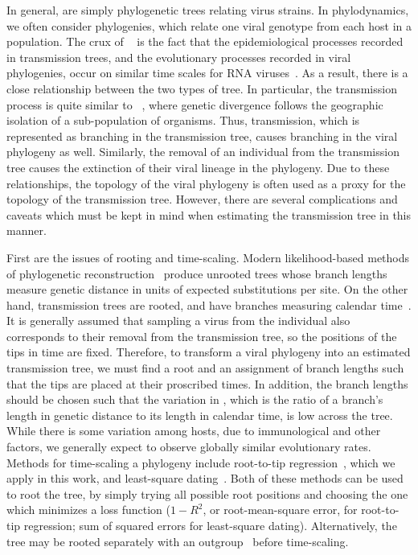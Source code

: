 In general,  are simply phylogenetic trees relating
virus strains. In phylodynamics, we often consider 
phylogenies, which relate one viral genotype from each host in a population.
The crux of ~\autocite{grenfell2004unifying} is the fact
that the epidemiological processes recorded in transmission trees, and the
evolutionary processes recorded in viral phylogenies, occur on similar time
scales for RNA viruses~\autocite{drummond2003measurably}. As a result, there is
a close relationship between the two types of tree. In particular, the
transmission process is quite similar to ~\autocite{coyne2004speciation}, where genetic divergence follows
the geographic isolation of a sub-population of organisms. Thus, transmission,
which is represented as branching in the transmission tree, causes branching in
the viral phylogeny as well. Similarly, the removal of an individual from the
transmission tree causes the extinction of their viral lineage in the
phylogeny. Due to these relationships, the topology of the viral phylogeny is
often used as a proxy for the topology of the transmission tree. However, there
are several complications and caveats which must be kept in mind when
estimating the transmission tree in this manner.

First are the issues of rooting and time-scaling. Modern likelihood-based
methods of phylogenetic reconstruction~\autocite[\eg][]{price2010fasttree,
stamatakis2014raxml} produce unrooted trees whose branch lengths measure
genetic distance in units of expected substitutions per site. On the other
hand, transmission trees are rooted, and have branches measuring calendar
time~\autocite{pybus2009evolutionary}. It is generally assumed that sampling a
virus from the individual also corresponds to their removal from the
transmission tree, so the positions of the tips in time are fixed. Therefore,
to transform a viral phylogeny into an estimated transmission tree, we must
find a root and an assignment of branch lengths such that the tips are placed
at their proscribed times. In addition, the branch lengths should be chosen
such that the variation in , which is the ratio of a
branch's length in genetic distance to its length in calendar time, is low
across the tree. While there is some variation among hosts, due to
immunological and other factors, we generally expect to observe globally
similar evolutionary rates. Methods for time-scaling a phylogeny include
root-to-tip regression~\autocite{shankarappa1999consistent, korber2000timing,
drummond2003inference}, which we apply in this work, and least-square
dating~\autocite{to2015fast}. Both of these methods can be used to root the
tree, by simply trying all possible root positions and choosing the one which
minimizes a loss function ($1-R^2$, or root-mean-square error, for root-to-tip
regression; sum of squared errors for least-square dating). Alternatively, the
tree may be rooted separately with an outgroup~\autocite{li1988rates} before
time-scaling.

